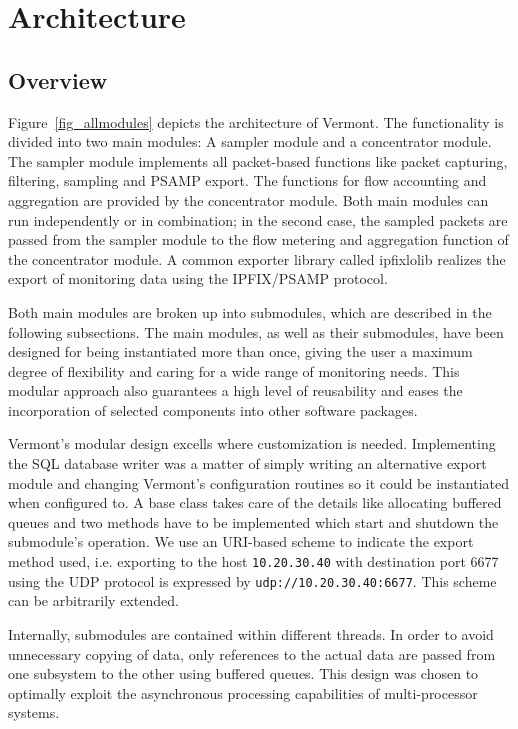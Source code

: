 \section{Architecture}
\label{sec:architecture}

\subsection{Overview}

Figure~\ref{fig_allmodules} depicts the architecture of Vermont.
The functionality is divided into two main modules: A sampler module and a concentrator module.
The sampler module implements all packet-based functions like packet capturing, filtering, sampling and PSAMP export.
The functions for flow accounting and aggregation are provided by the concentrator module.
Both main modules can run independently or in combination; in the second case, the sampled packets are passed from the sampler module to the flow metering and aggregation function of the concentrator module.
A common exporter library called ipfixlolib realizes the export of monitoring data using the IPFIX/PSAMP protocol.

Both main modules are broken up into submodules, which are described in the following subsections.
The main modules, as well as their submodules, have been designed for being instantiated more than once, giving the user a maximum degree of flexibility and caring for a wide range of monitoring needs.
This modular approach also guarantees a high level of reusability and eases the incorporation of selected components into other software packages.

Vermont's modular design excells where customization is needed.
Implementing the SQL database writer was a matter of simply writing an alternative export module and changing Vermont's configuration routines so it could be instantiated when configured to.
A base class takes care of the details like allocating buffered queues and two methods have to be implemented which start and shutdown the submodule's operation.
We use an URI-based scheme to indicate the export method used, i.e. exporting to the host \texttt{10.20.30.40} with destination port 6677 using the UDP protocol is expressed by \texttt{udp://10.20.30.40:6677}. This scheme can be arbitrarily extended.

Internally, submodules are contained within different threads.
In order to avoid unnecessary copying of data, only references to the actual data are passed from one subsystem to the other using buffered queues.
This design was chosen to optimally exploit the asynchronous processing capabilities of multi-processor systems.

